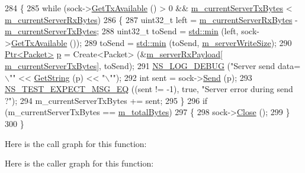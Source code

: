 \begin{DoxyCode}
284 \{
285   \textcolor{keywordflow}{while} (sock->\hyperlink{classns3_1_1Socket_ae7cf62e3acf44106bfa1d40eaeaec151}{GetTxAvailable} () > 0 && \hyperlink{classTcpTestCase_a3a7557075e3c745e487f76f26bca6423}{m\_currentServerTxBytes} < 
      \hyperlink{classTcpTestCase_aef99b385054dd7eb73a7e45b2ce3d976}{m\_currentServerRxBytes})
286     \{
287       uint32\_t left = \hyperlink{classTcpTestCase_aef99b385054dd7eb73a7e45b2ce3d976}{m\_currentServerRxBytes} - 
      \hyperlink{classTcpTestCase_a3a7557075e3c745e487f76f26bca6423}{m\_currentServerTxBytes};
288       uint32\_t toSend = \hyperlink{80211b_8c_ac6afabdc09a49a433ee19d8a9486056d}{std::min} (left, sock->\hyperlink{classns3_1_1Socket_ae7cf62e3acf44106bfa1d40eaeaec151}{GetTxAvailable} ());
289       toSend = \hyperlink{80211b_8c_ac6afabdc09a49a433ee19d8a9486056d}{std::min} (toSend, \hyperlink{classTcpTestCase_adc7913a86c86cc101b620d153b7b1af9}{m\_serverWriteSize});
290       \hyperlink{classns3_1_1Ptr}{Ptr<Packet>} \hyperlink{lte__link__budget_8m_ac9de518908a968428863f829398a4e62}{p} = Create<Packet> (&\hyperlink{classTcpTestCase_af1647be1c24b49579653f2c691bc802b}{m\_serverRxPayload}[
      \hyperlink{classTcpTestCase_a3a7557075e3c745e487f76f26bca6423}{m\_currentServerTxBytes}], toSend);
291       \hyperlink{group__logging_ga413f1886406d49f59a6a0a89b77b4d0a}{NS\_LOG\_DEBUG} (\textcolor{stringliteral}{"Server send data=\(\backslash\)""} << \hyperlink{tcp-test_8cc_ab9425fc2dc406843f955d1565b7fc804}{GetString} (p) << \textcolor{stringliteral}{"\(\backslash\)""});
292       \textcolor{keywordtype}{int} sent = sock->\hyperlink{classns3_1_1Socket_a036901c8f485fe5b6eab93b7f2ec289d}{Send} (p);
293       \hyperlink{group__testing_ga7304ba46a28d8cf08dfdfd6499cf7068}{NS\_TEST\_EXPECT\_MSG\_EQ} ((sent != -1), \textcolor{keyword}{true}, \textcolor{stringliteral}{"Server error during send ?"});
294       m\_currentServerTxBytes += sent;
295     \}
296   \textcolor{keywordflow}{if} (m\_currentServerTxBytes == \hyperlink{classTcpTestCase_a9b4497e157a0b1fb7fdf90e833696201}{m\_totalBytes})
297     \{
298       sock->\hyperlink{classns3_1_1Socket_abdac6e2498c5aa2963ef361d4200ddf3}{Close} ();
299     \}
300 \}
\end{DoxyCode}


Here is the call graph for this function\+:




Here is the caller graph for this function\+:


